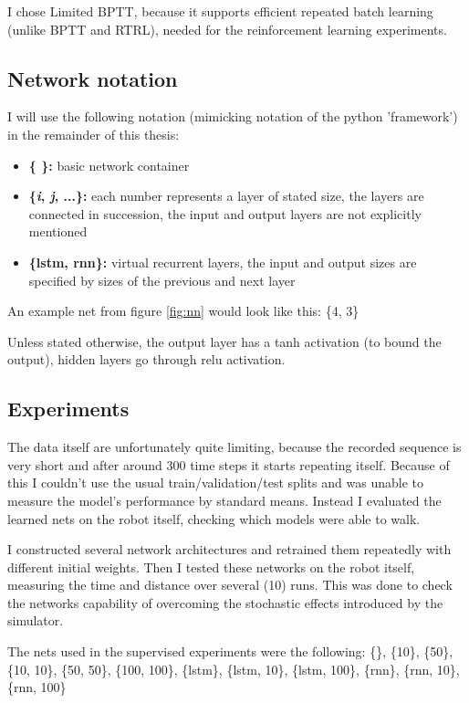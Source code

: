 I chose Limited BPTT, because it supports efficient repeated batch learning (unlike BPTT and RTRL), needed for the reinforcement learning experiments.

\subsection{Network notation}
I will use the following notation (mimicking notation of the python 'framework') in the remainder of this thesis:

\begin{itemize}
\item \textbf{\{ \}:} basic network container
\item \textbf{\{\textit{i}, \textit{j}, ...\}:} each number represents a layer of stated size, the layers are connected in succession, the input and output layers are not explicitly mentioned
\item \textbf{\{lstm, rnn\}:} virtual recurrent layers, the input and output sizes are specified by sizes of the previous and next layer
\end{itemize}

An example net from figure \ref{fig:nn} would look like this: \{4, 3\}

Unless stated otherwise, the output layer has a tanh activation (to bound the output), hidden layers go through relu activation.

\subsection{Experiments}

The data itself are unfortunately quite limiting, because the recorded sequence is very short and after around 300 time steps it starts repeating itself. Because of this I couldn't use the usual train/validation/test splits and was unable to measure the model's performance by standard means. Instead I evaluated the learned nets on the robot itself, checking which models were able to walk.

I constructed several network architectures and retrained them repeatedly with different initial weights. Then I tested these networks on the robot itself, measuring the time and distance over several (10) runs. This was done to check the networks capability of overcoming the stochastic effects introduced by the simulator.

The nets used in the supervised experiments were the following:
\{\}, \{10\}, \{50\}, \{10, 10\}, \{50, 50\}, \{100, 100\}, \{lstm\}, \{lstm, 10\}, \{lstm, 100\}, \{rnn\}, \{rnn, 10\}, \{rnn, 100\}

